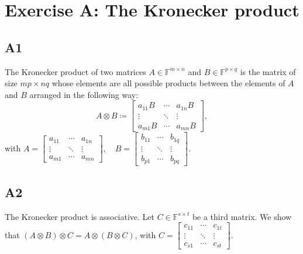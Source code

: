 \documentclass[11pt]{article}
\newcommand{\field}{\mathbb{F}} %
\newcommand{\kp}{\otimes} %
\begin{document}
\section*{Exercise A: The Kronecker product}
\subsection*{A1}
The Kronecker product of two matrices \(A \in \field^{m \times n}\) and \(B \in \field^{p \times q}\) is the matrix of size \(mp \times nq\) whose elements are all possible products between the elements of \(A\) and \(B\) arranged in the following way:
\[
A \kp B \coloneqq \begin{bmatrix}
a_{11} B & \cdots & a_{1n}B \\
\vdots & \ddots & \vdots \\
a_{m1} B & \cdots & a_{mn} B
\end{bmatrix},
\]
with $A = \begin{bmatrix}a_{11} & \cdots & a_{1n} \\
\vdots & \ddots & \vdots \\
a_{m1} & \cdots & a_{mn}
\end{bmatrix}, \quad B = \begin{bmatrix}b_{11} & \cdots & b_{1q} \\
\vdots & \ddots & \vdots \\
b_{p1} & \cdots & b_{pq}
\end{bmatrix}$.

\subsection*{A2}
The Kronecker product is associative.
Let \(C \in \field^{s \times t}\) be a third matrix.
We show that \((A \kp B) \kp C = A \kp (B \kp C)\), with $C = \begin{bmatrix}c_{11} & \cdots & c_{1t} \\
\vdots & \ddots & \vdots \\
c_{s1} & \cdots & c_{st}
\end{bmatrix}.
$
\end{document}
